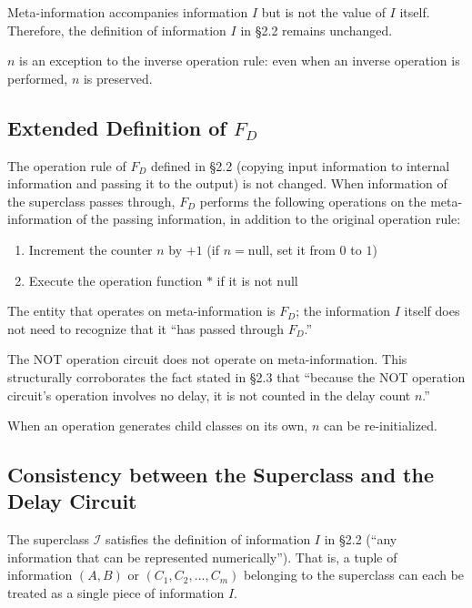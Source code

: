 \documentclass[12pt,a4paper]{article}
\begin{document}
Meta-information accompanies information $I$ but is not the value of $I$ itself. Therefore, the
definition of information $I$ in \cite{kihara2026} \S2.2 remains unchanged.

$n$ is an exception to the inverse operation rule: even when an inverse operation is performed, $n$
is preserved.

\subsection{Extended Definition of $F_D$}

The operation rule of $F_D$ defined in \cite{kihara2026} \S2.2 (copying input information to
internal information and passing it to the output) is not changed. When information of the
superclass passes through, $F_D$ performs the following operations on the meta-information of the
passing information, in addition to the original operation rule:

\begin{enumerate}
  \item Increment the counter $n$ by $+1$ (if $n = \mathrm{null}$, set it from $0$ to $1$)
  \item Execute the operation function $*$ if it is not $\mathrm{null}$
\end{enumerate}

The entity that operates on meta-information is $F_D$; the information $I$ itself does not need to
recognize that it ``has passed through $F_D$.''

The NOT operation circuit does not operate on meta-information. This structurally corroborates the
fact stated in \cite{kihara2026} \S2.3 that ``because the NOT operation circuit's operation
involves no delay, it is not counted in the delay count $n$.''

When an operation generates child classes on its own, $n$ can be re-initialized.

\subsection{Consistency between the Superclass and the Delay Circuit}

The superclass $\mathcal{I}$ satisfies the definition of information $I$ in
\cite{kihara2026} \S2.2 (``any information that can be represented numerically''). That is, a
tuple of information $(A, B)$ or $(C_1, C_2, \ldots, C_m)$ belonging to the superclass can each
be treated as a single piece of information $I$.
\end{document}
